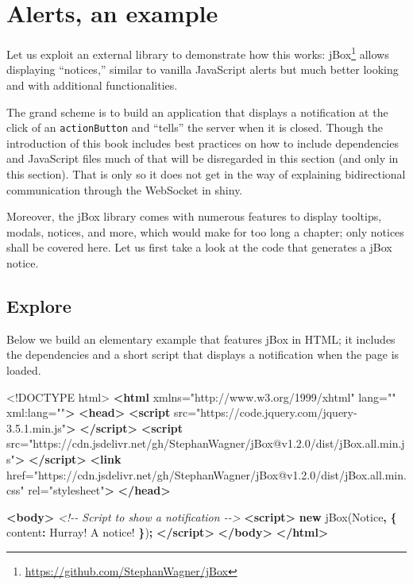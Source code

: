 \documentclass[
]{krantz}
\makeatletter
\newenvironment{Shaded}{\begin{snugshade}}{\end{snugshade}}
\newcommand{\AttributeTok}[1]{\textcolor[rgb]{0.61,0.61,0.61}{#1}}
\newcommand{\CommentTok}[1]{\textcolor[rgb]{0.37,0.37,0.37}{\textit{#1}}}
\newcommand{\DataTypeTok}[1]{\textcolor[rgb]{0.27,0.27,0.27}{#1}}
\newcommand{\KeywordTok}[1]{\textcolor[rgb]{0.27,0.27,0.27}{\textbf{#1}}}
\newcommand{\NormalTok}[1]{#1}
\newcommand{\OperatorTok}[1]{\textcolor[rgb]{0.43,0.43,0.43}{\textbf{#1}}}
\newcommand{\OtherTok}[1]{\textcolor[rgb]{0.37,0.37,0.37}{#1}}
\newcommand{\StringTok}[1]{\textcolor[rgb]{0.5,0.5,0.5}{#1}}
\renewcommand{\href}[2]{#2\footnote{\url{#1}}}
\newenvironment{kframe}{%
\medskip{}
\setlength{\fboxsep}{.8em}
 \def\at@end@of@kframe{}%
 \ifinner\ifhmode%
  \def\at@end@of@kframe{\end{minipage}}%
  \begin{minipage}{\columnwidth}%
 \fi\fi%
 \def\FrameCommand##1{\hskip\@totalleftmargin \hskip-\fboxsep
 \colorbox{shadecolor}{##1}\hskip-\fboxsep
     \hskip-\linewidth \hskip-\@totalleftmargin \hskip\columnwidth}%
 \MakeFramed {\advance\hsize-\width
   \@totalleftmargin\z@ \linewidth\hsize
   \@setminipage}}%
 {\par\unskip\endMakeFramed%
 \at@end@of@kframe}
\renewenvironment{Shaded}{\begin{kframe}}{\end{kframe}}
\makeatother
\begin{document}
\hypertarget{shiny-intro-example}{%
\section{Alerts, an example}\label{shiny-intro-example}}

Let us exploit an external library to demonstrate how this works: \href{https://github.com/StephanWagner/jBox}{jBox} allows displaying ``notices,'' similar to vanilla JavaScript alerts but much better looking and with additional functionalities.

The grand scheme is to build an application that displays a notification at the click of an \texttt{actionButton} and ``tells'' the server when it is closed. Though the introduction of this book includes best practices on how to include dependencies and JavaScript files much of that will be disregarded in this section (and only in this section). That is only so it does not get in the way of explaining bidirectional communication through the WebSocket in shiny.

Moreover, the jBox library comes with numerous features to display tooltips, modals, notices, and more, which would make for too long a chapter; only notices shall be covered here. Let us first take a look at the code that generates a jBox notice.

\hypertarget{shiny-intro-explore}{%
\subsection{Explore}\label{shiny-intro-explore}}

Below we build an elementary example that features jBox in HTML; it includes the dependencies and a short script that displays a notification when the page is loaded.

\begin{Shaded}
\begin{Highlighting}[]
\DataTypeTok{<!DOCTYPE }\NormalTok{html}\DataTypeTok{>}
\KeywordTok{<html}\OtherTok{ xmlns=}\StringTok{"http://www.w3.org/1999/xhtml"}\OtherTok{ lang=}\StringTok{""}\OtherTok{ xml:lang=}\StringTok{""}\KeywordTok{>}
\KeywordTok{<head>}
\KeywordTok{<script} 
\OtherTok{  src=}\StringTok{"https://code.jquery.com/jquery{-}3.5.1.min.js"}\KeywordTok{>}
  \KeywordTok{</script>}
\KeywordTok{<script} 
\OtherTok{  src=}\StringTok{"https://cdn.jsdelivr.net/gh/StephanWagner/jBox@v1.2.0/dist/jBox.all.min.js"}\KeywordTok{>}
\KeywordTok{</script>}
\KeywordTok{<link} 
\OtherTok{  href=}\StringTok{"https://cdn.jsdelivr.net/gh/StephanWagner/jBox@v1.2.0/dist/jBox.all.min.css"} 
\OtherTok{  rel=}\StringTok{"stylesheet"}\KeywordTok{>}
\KeywordTok{</head>}

\KeywordTok{<body>}
  \CommentTok{<!{-}{-} Script to show a notification {-}{-}>}
  \KeywordTok{<script>}
    \KeywordTok{new} \AttributeTok{jBox}\NormalTok{(}\StringTok{\textquotesingle{}Notice\textquotesingle{}}\OperatorTok{,} \OperatorTok{\{}
      \DataTypeTok{content}\OperatorTok{:} \StringTok{\textquotesingle{}Hurray! A notice!\textquotesingle{}}
    \OperatorTok{\}}\NormalTok{)}\OperatorTok{;}
  \KeywordTok{</script>}
\KeywordTok{</body>}
\KeywordTok{</html>}
\end{Highlighting}
\end{Shaded}
\end{document}
